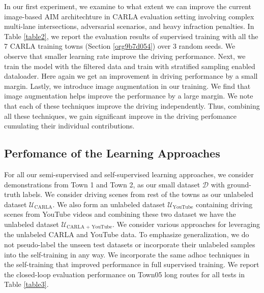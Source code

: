\documentclass[12pt, letterpaper,cleardoubleempty,BCOR1cm]{scrbook}
\begin{document}
In our first experiment, we examine to what extent we can improve the current
image-based AIM architechture \cite{Prakash2021} in CARLA evaluation setting
involving complex multi-lane intersections, adversarial scenarios, and heavy
infraction penalties. In Table \ref{table2}, we report the evaluation results of
supervised training with all the 7 CARLA training towns (Section \ref{org9b7d054}) over 3
random seeds. We observe that smaller learning rate improve the driving
performance. Next, we train the model with the filtered data and train with
stratified sampling enabled dataloader. Here again we get an improvement in
driving performance by a small margin. Lastly, we introduce image augmentation
in our training. We find that image augmentation helps improve the performance
by a large margin. We note that each of these techniques improve the driving
independently. Thus, combining all these techniques, we gain significant improve
in the driving perfomance cumulating their individual contributions.

\subsection{Perfomance of the Learning Approaches}
\label{sec:org87447f2}
For all our semi-supervised and self-supervised learning approaches, we consider
demonstrations from Town 1 and Town 2, as our small dataset \(\mathcal{D}\) with
ground-truth labels. We consider driving scenes from rest of the towns as our
unlabeled dataset \(\mathcal{U}_{\text{CARLA}}\). We also form an unlabeled dataset
\(\mathcal{U}_{\text{YouTube}}\) containing driving scenes from YouTube videos and
combining these two dataset we have the unlabeled dataset \(\mathcal{U}_{\text{CARLA +
YouTube}}\). We consider various approaches for leveraging the unlabeled CARLA
and YouTube data. To emphasize generalization, we do not pseudo-label the unseen
test datasets or incorporate their unlabeled samples into the self-training in
any way. We incorporate the same adhoc techniques in the self-training that
improved performance in full supervised training. We report the closed-loop
evaluation performance on Town05 long routes for all tests in Table
\ref{table3}.
\end{document}
